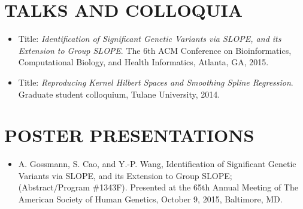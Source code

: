 \documentclass[margin]{res} %
\begin{document}
\begin{resume}

\section{TALKS AND COLLOQUIA}

\begin{itemize} \itemsep -2pt %
    \item Title: {\it Identification of Significant Genetic Variants via SLOPE, and its Extension to Group SLOPE}. The 6th ACM Conference on Bioinformatics, Computational Biology, and Health Informatics, Atlanta, GA, 2015.
    \item Title: {\it Reproducing Kernel Hilbert Spaces and Smoothing Spline Regression}. Graduate student colloquium, Tulane University, 2014.
\end{itemize}

\section{POSTER PRESENTATIONS}

\begin{itemize} \itemsep -2pt %
\item A. Gossmann, S. Cao, and Y.-P. Wang, Identification of Significant Genetic Variants via SLOPE, and its Extension to Group SLOPE; (Abstract/Program \#1343F). Presented at the 65th Annual Meeting of The American Society of Human Genetics, October 9, 2015, Baltimore, MD.
\end{itemize}


\end{resume}
\end{document}

